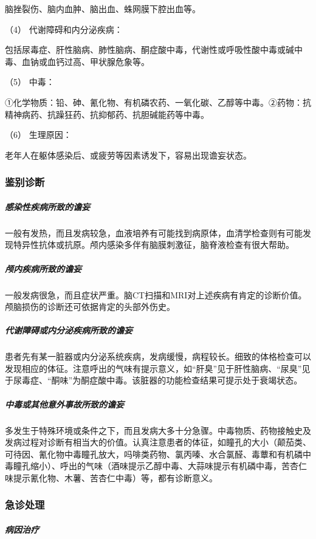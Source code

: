 脑挫裂伤、脑内血肿、脑出血、蛛网膜下腔出血等。

\hypertarget{text00044.htmlux5cux23CHP1-18-2-1-3-4}{}
（4） 代谢障碍和内分泌疾病：

包括尿毒症、肝性脑病、肺性脑病、酮症酸中毒，代谢性或呼吸性酸中毒或碱中毒、血钠或血钙过高、甲状腺危象等。

\hypertarget{text00044.htmlux5cux23CHP1-18-2-1-3-5}{}
（5） 中毒：

①化学物质：铅、砷、氰化物、有机磷农药、一氧化碳、乙醇等中毒。②药物：抗精神病药、抗躁狂药、抗抑郁药、抗胆碱能药等中毒。

\hypertarget{text00044.htmlux5cux23CHP1-18-2-1-3-6}{}
（6） 生理原因：

老年人在躯体感染后、或疲劳等因素诱发下，容易出现谵妄状态。

\subsubsection{鉴别诊断}

\subparagraph{感染性疾病所致的谵妄}

一般有发热，而且发病较急，血液培养有可能找到病原体，血清学检查则有可能发现特异性抗体或抗原。颅内感染多伴有脑膜刺激征，脑脊液检查有很大帮助。

\subparagraph{颅内疾病所致的谵妄}

一般发病很急，而且症状严重。脑CT扫描和MRI对上述疾病有肯定的诊断价值。颅脑损伤的诊断还可依据肯定的头部外伤史。

\subparagraph{代谢障碍或内分泌疾病所致的谵妄}

患者先有某一脏器或内分泌系统疾病，发病缓慢，病程较长。细致的体格检查可以发现相应的体征。注意呼出的气味有提示意义，如“肝臭”见于肝性脑病、“尿臭”见于尿毒症、“酮味”为酮症酸中毒。该脏器的功能检查结果可提示处于衰竭状态。

\subparagraph{中毒或其他意外事故所致的谵妄}

多发生于特殊环境或条件之下，而且发病大多十分急骤。中毒物质、药物接触史及发病过程对诊断有相当大的价值。认真注意患者的体征，如瞳孔的大小（颠茄类、可待因、氰化物中毒瞳孔放大，吗啡类药物、氯丙嗪、水合氯醛、毒蕈和有机磷中毒瞳孔缩小）、呼出的气味（酒味提示乙醇中毒、大蒜味提示有机磷中毒，苦杏仁味提示氰化物、木薯、苦杏仁中毒）等，都有诊断意义。

\subsubsection{急诊处理}

\subparagraph{病因治疗}

